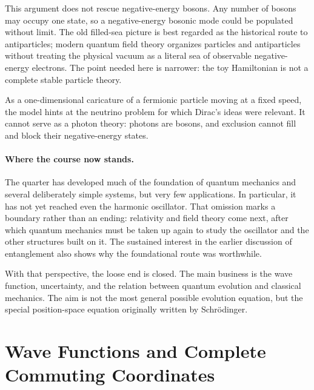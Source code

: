This argument does not rescue negative-energy bosons. Any number of bosons may occupy one state, so a negative-energy bosonic mode could be populated without limit. The old filled-sea picture is best regarded as the historical route to antiparticles; modern quantum field theory organizes particles and antiparticles without treating the physical vacuum as a literal sea of observable negative-energy electrons. The point needed here is narrower: the toy Hamiltonian is not a complete stable particle theory.

As a one-dimensional caricature of a fermionic particle moving at a fixed speed, the model hints at the neutrino problem for which Dirac's ideas were relevant. It cannot serve as a photon theory: photons are bosons, and exclusion cannot fill and block their negative-energy states.

\begin{classroomqa}
\end{classroomqa}

\paragraph{Where the course now stands.}
The quarter has developed much of the foundation of quantum mechanics and several deliberately simple systems, but very few applications. In particular, it has not yet reached even the harmonic oscillator. That omission marks a boundary rather than an ending: relativity and field theory come next, after which quantum mechanics must be taken up again to study the oscillator and the other structures built on it. The sustained interest in the earlier discussion of entanglement also shows why the foundational route was worthwhile.

With that perspective, the loose end is closed. The main business is the wave function, uncertainty, and the relation between quantum evolution and classical mechanics. The aim is not the most general possible evolution equation, but the special position-space equation originally written by Schr\"odinger.

\section{Wave Functions and Complete Commuting Coordinates}


